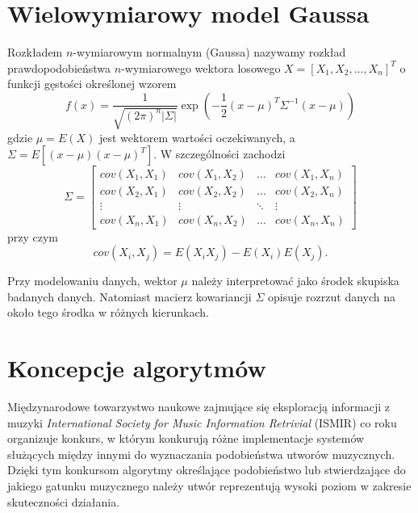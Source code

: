 \section{Wielowymiarowy model Gaussa}
Rozkładem $n$-wymiarowym normalnym (Gaussa) \cite{Gaussa} nazywamy rozkład
prawdopodobieństwa
$n$-wymiarowego wektora losowego $X=\left[ X_1, X_2,\ldots , X_n \right] ^T $ o
funkcji gęstości określonej wzorem
\begin{equation}
f(x)=\frac{1}{\sqrt{(2\pi )^n \left| \Sigma \right| }}\exp
\left( -\frac{1}{2} (x-\mu )^{T}\Sigma ^{-1} (x-\mu ) \right) 
\end{equation}
gdzie $\mu= E(X)$ jest wektorem wartości oczekiwanych, a $\Sigma=E[(x-\mu
)(x-\mu )^T]$. W szczególności zachodzi
\begin{equation} \Sigma=\left[ 
\begin{array}{cccc}
cov(X_1,X_1) & cov(X_1,X_2) & \ldots & cov(X_1,X_n)\\
cov(X_2,X_1) & cov(X_2,X_2) & \ldots & cov(X_2,X_n)\\
\vdots & \vdots & \ddots & \vdots\\
cov(X_n,X_1) & cov(X_n,X_2) & \ldots & cov(X_n,X_n)
          \end{array} \right]
\end{equation}
przy czym
\begin{equation}
cov(X_i, X_j)=E(X_i X_j) - E(X_i) E(X_j).
\end{equation}

Przy modelowaniu danych, wektor $\mu$ należy interpretować jako środek skupiska
badanych danych. Natomiast macierz kowariancji $\Sigma$ opisuje rozrzut danych
na około tego środka w różnych kierunkach.

\section{Koncepcje algorytmów}
Międzynarodowe towarzystwo naukowe zajmujące się eksploracją informacji z
muzyki \textit{International Society for Music Information Retrivial} (ISMIR) co
roku organizuje konkurs, w którym konkurują różne implementacje systemów
służących między innymi do wyznaczania podobieństwa utworów muzycznych. Dzięki
tym konkursom algorytmy określające podobieństwo lub
stwierdzające do jakiego gatunku muzycznego należy utwór reprezentują wysoki
poziom w zakresie skuteczności działania.

